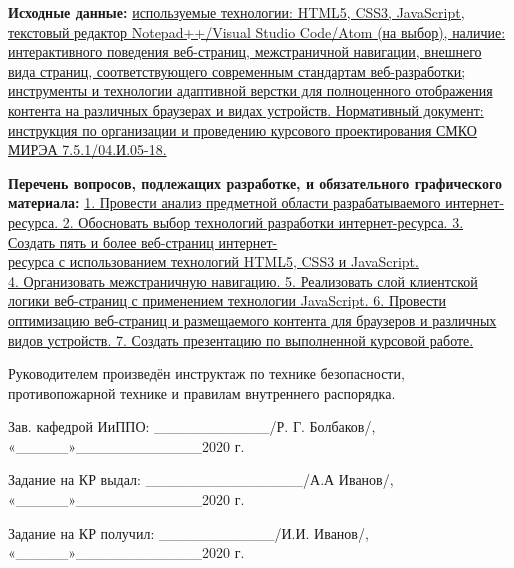 \documentclass[12pt, a4paper]{extarticle}
\begin{document}
\bigskip

\textbf{Исходные данные:} \uline{используемые технологии: HTML5,
CSS3, JavaScript, текстовый редактор Notepad++/Visual Studio Code/Atom
(на выбор), наличие: интерактивного поведения веб-страниц, межстраничной
навигации, внешнего вида страниц, соответствующего современным
стандартам веб-разработки; инструменты и технологии адаптивной верстки
для полноценного отображения контента на различных браузерах и видах
устройств. Нормативный документ: инструкция по организации и проведению
курсового проектирования СМКО МИРЭА 7.5.1/04.И.05-18.}

\bigskip

\textbf{Перечень вопросов, подлежащих разработке, и обязательного
графического материала:} \uline{1. Провести анализ предметной
области разрабатываемого интернет-ресурса. 2. Обосновать выбор
технологий разработки интернет-ресурса. 3. Создать пять и более
веб-страниц интернет-\\ресурса с использованием технологий HTML5, CSS3 и
JavaScript.\\
4. Организовать межстраничную навигацию. 5. Реализовать слой клиентской
логики веб-страниц с применением технологии JavaScript. 6. Провести
оптимизацию веб-страниц и размещаемого контента для браузеров и
различных видов устройств. 7. Создать презентацию по выполненной
курсовой работе.}

\bigskip

Руководителем произведён инструктаж по технике безопасности,
противопожарной технике и правилам внутреннего распорядка.

\fontsize{12pt}{1.5}\selectfont

\bigskip

Зав. кафедрой ИиППО: \_\_\_\_\_\_\_\_\_\_\_/Р. Г. Болбаков/,
«\_\_\_\_\_»\_\_\_\_\_\_\_\_\_\_\_\_2020 г.

\medskip

Задание на КР выдал: \_\_\_\_\_\_\_\_\_\_\_\_\_\_\_/А.А Иванов/,
«\_\_\_\_\_»\_\_\_\_\_\_\_\_\_\_\_\_2020 г.

\medskip

Задание на КР получил: \_\_\_\_\_\_\_\_\_\_\_/И.И. Иванов/,
«\_\_\_\_\_»\_\_\_\_\_\_\_\_\_\_\_\_2020 г.
\end{document}
